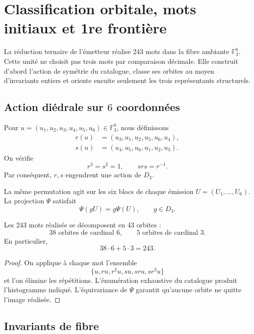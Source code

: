 
\chapter{Classification orbitale, mots initiaux et 1re frontière}
\label{chap:orbitas-elevacion-r36}

La réduction ternaire de l'émetteur réalise 243 mots dans la fibre
ambiante \(\mathbb F_3^6\). Cette unité ne choisit pas trois mots par
comparaison décimale. Elle construit d'abord l'action de symétrie du catalogue,
classe ses orbites au moyen d'invariants entiers et oriente ensuite seulement
les trois représentants structurels.

\section{Action diédrale sur \(6\) coordonnées}

Pour \(u=(u_1,u_2,u_3,u_4,u_5,u_6)\in\mathbb F_3^6\), nous définissons
\begin{align*}
 r(u)&=(u_3,u_1,u_2,u_5,u_6,u_4),\\
 s(u)&=(u_4,u_5,u_6,u_1,u_2,u_3).
\end{align*}
On vérifie
\[
 r^3=s^2=1,
 \qquad srs=r^{-1}.
\]
Par conséquent, \(r,s\) engendrent une action de \(D_3\).

La même permutation agit sur les six blocs de chaque émission
\(U=(U_1,\ldots,U_6)\). La projection \(\Psi\) satisfait
\[
 \Psi(gU)=g\Psi(U),
 \qquad g\in D_3.
\]

\begin{theorem}
\label{thm:catalogo-descomposicion-d3}
Les 243 mots réalisés se décomposent en 43 orbites :
\[
 38\text{ orbites de cardinal }6,
 \qquad
 5\text{ orbites de cardinal }3.
\]
En particulier,
\[
 38\cdot6+5\cdot3=243.
\]
\end{theorem}

\begin{proof}
On applique à chaque mot l'ensemble
\[
 \{u,ru,r^2u,su,sru,sr^2u\}
\]
et l'on élimine les répétitions. L'énumération exhaustive du catalogue produit
l'histogramme indiqué. L'équivariance de \(\Psi\) garantit qu'aucune
orbite ne quitte l'image réalisée.
\end{proof}

\section{Invariants de fibre}

